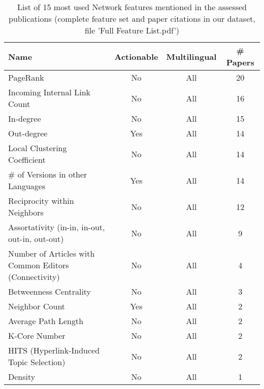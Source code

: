 \begin{table}[htbp]
    \caption{List of 15 most used Network features mentioned in the assessed publications (complete feature set and paper citations in our dataset, file 'Full Feature List.pdf')}
    \label{tab:feat_Network}
    \centering
    \begin{tabular}{m{} c c c}
        \toprule
        \textbf{Name} & \textbf{Actionable} & \textbf{Multilingual} & \textbf{\# Papers} \\ 
        \midrule
        PageRank & No & All & 20 \\
        Incoming Internal Link Count & No & All & 16 \\
        In-degree & No & All & 15 \\
        Out-degree & Yes & All & 14 \\
        Local Clustering Coefficient & No & All & 14 \\
        \# of Versions in other Languages & Yes & All & 14 \\
        Reciprocity within Neighbors & No & All & 12 \\
        Assortativity (in-in, in-out, out-in, out-out) & No & All & 9 \\
        Number of Articles with Common Editors (Connectivity) & No & All & 4 \\
        Betweenness Centrality & No & All & 3 \\
        Neighbor Count & Yes & All & 2 \\
        Average Path Length & No & All & 2 \\
        K-Core Number & No & All & 2 \\
        HITS (Hyperlink-Induced Topic Selection) & No & All & 2 \\
        Density & No & All & 1 \\
        \bottomrule
    \end{tabular}
\end{table}